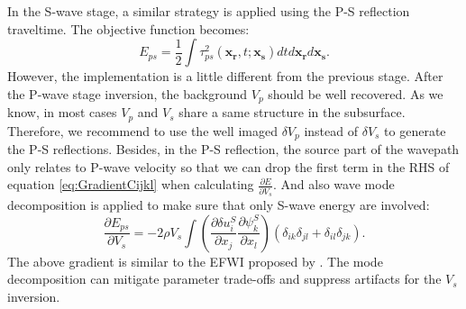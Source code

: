 In the S-wave stage, a similar strategy is applied using the P-S reflection
traveltime. The objective function becomes:
\begin{equation}
	E_{ps}=\frac{1}{2}\int\tau^2_{ps}(\mathbf{x_r},t;\mathbf{x_s})dtd\mathbf{x_r}d\mathbf{x_s}.
    \label{eq:ObjectivefunctionPS} 
\end{equation}
However, the implementation is a little different from the previous stage. After the
P-wave stage inversion, the background $V_p$ should be well recovered. As we know, in
most cases $V_p$ and $V_s$ share a same structure in the subsurface. Therefore, we
recommend to use the well imaged $\delta V_p$ instead of $\delta V_s$ to generate the P-S reflections. 
Besides, in the P-S reflection, the source part of the wavepath only relates to P-wave velocity so
that we can drop the first term in the RHS of equation \eqref{eq:GradientCijkl} when
calculating $\frac{\partial E}{\partial V_s}$. And also wave mode decomposition is
applied to make sure that only S-wave energy are involved:
\begin{equation}
	\frac{\partial E_{ps}}{\partial V_s}=-2\rho V_s
	\int (\frac{\partial \delta u^S_{i}}{\partial
    x_j}\frac{\partial \psi^S_{k}}{\partial x_l})
	(\delta_{ik}\delta_{jl}+
	\delta_{il}\delta_{jk}).
    \label{eq:GradientVel}
\end{equation}
The above gradient is similar to the EFWI proposed by \cite{Wang2015a}. The mode
decomposition can mitigate parameter trade-offs and suppress artifacts for the
$V_s$ inversion.
